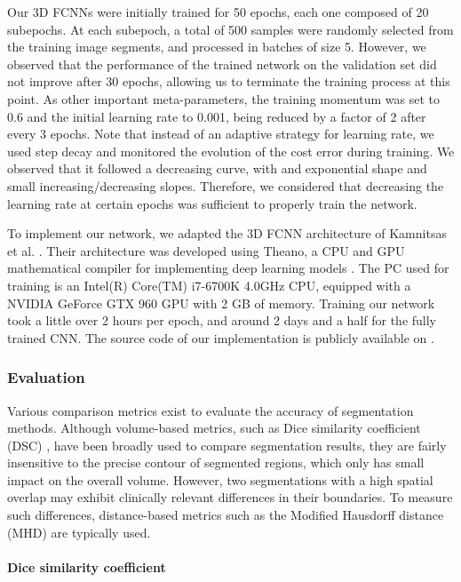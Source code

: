 \documentclass[twoside,fleqn,espcrc2]{elsarticle}
\begin{document}
Our 3D FCNNs were initially trained for 50 epochs, each one composed of 20 subepochs. At each subepoch, a total of 500 samples were randomly selected from the training image segments, and processed in batches of size 5. However, we observed that the performance of the trained network on the validation set did not improve after 30 epochs, allowing us to terminate the training process at this point. As other important meta-parameters, the training momentum was set to 0.6 and the initial learning rate to 0.001, being reduced by a factor of 2 after every 3 epochs. Note that instead of an adaptive strategy for learning rate, we used step decay and monitored the evolution of the cost error during training. We observed that it followed a decreasing curve, with and exponential shape and small increasing/decreasing slopes. Therefore, we considered that decreasing the learning rate at certain epochs was sufficient to properly train the network.

To implement our network, we adapted the 3D FCNN architecture of Kamnitsas et al. \cite{kamnitsas2016efficient}. Their architecture was developed using Theano, a CPU and GPU mathematical compiler for implementing deep learning models \cite{bergstra2010theano}. The PC used for training is an Intel(R) Core(TM) i7-6700K 4.0GHz CPU, equipped with a NVIDIA GeForce GTX 960 GPU with 2 GB of memory. Training our network took a little over 2 hours per epoch, and around 2 days and a half for the fully trained CNN. The source code of our implementation is publicly available on \sloppy{}.


\subsubsection{Evaluation}
\label{sssec:evaluation}

Various comparison metrics exist to evaluate the accuracy of segmentation methods. Although volume-based metrics, such as Dice similarity coefficient (DSC) \cite{dice1945measures}, have been broadly used to compare segmentation results, they are fairly insensitive to the precise contour of segmented regions, which only has small impact on the overall volume. However, two segmentations with a high spatial overlap may exhibit clinically relevant differences in their boundaries. To measure such differences, distance-based metrics such as the Modified Hausdorff distance (MHD) are typically used.

\paragraph{\textbf{Dice similarity coefficient}}
\end{document}
